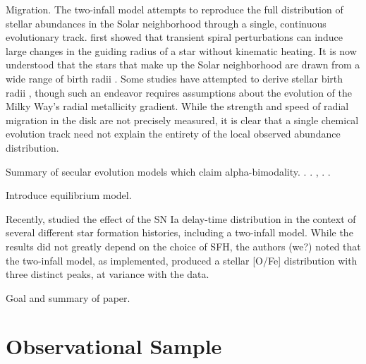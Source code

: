 \documentclass[twocolumn,twocolappendix,linenumbers]{aastex631}
\newcommand{\todo}[1]{{\color{red}#1}}
\begin{document}
\todo{Migration.} The two-infall model attempts to reproduce the full distribution of stellar abundances in the Solar neighborhood through a single, continuous evolutionary track. \citet{sellwood_radial_2002} first showed that transient spiral perturbations can induce large changes in the guiding radius of a star without kinematic heating. It is now understood that the stars that make up the Solar neighborhood are drawn from a wide range of birth radii \citep[e.g.,][]{schonrich_chemical_2009,frankel_measuring_2018,lehmann_probing_2024}. Some studies have attempted to derive stellar birth radii \citep[e.g.,][]{ratcliffe_unveiling_2023,lu_there_2024}, though such an endeavor requires assumptions about the evolution of the Milky Way's radial metallicity gradient. While the strength and speed of radial migration in the disk are not precisely measured, it is clear that a single chemical evolution track need not explain the entirety of the local observed abundance distribution.

\todo{Summary of secular evolution models which claim alpha-bimodality.} \citet{schonrich_chemical_2009}. \citet{kubryk_evolution_2015}. \citet{sharma_chemical_2021}, \citet{chen_chemical_2023}. \citet{prantzos_origin_2023}.

\todo{Introduce equilibrium model.}

Recently, \citet{dubay_galactic_2024} studied the effect of the SN Ia delay-time distribution in the context of several different star formation histories, including a two-infall model. While the results did not greatly depend on the choice of SFH, the authors \todo{(we?)} noted that the two-infall model, as implemented, produced a stellar [O/Fe] distribution with three distinct peaks, at variance with the data.

\todo{Goal and summary of paper.} 

\section{Observational Sample}
\label{sec:observational-sample}
\end{document}
